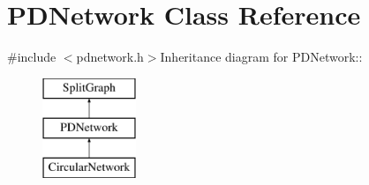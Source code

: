 \hypertarget{classPDNetwork}{
\section{PDNetwork Class Reference}
\label{classPDNetwork}
}


{\ttfamily \#include $<$pdnetwork.h$>$}Inheritance diagram for PDNetwork::\begin{figure}[H]
\begin{center}
\leavevmode
\includegraphics[height=3cm]{classPDNetwork}
\end{center}
\end{figure}
